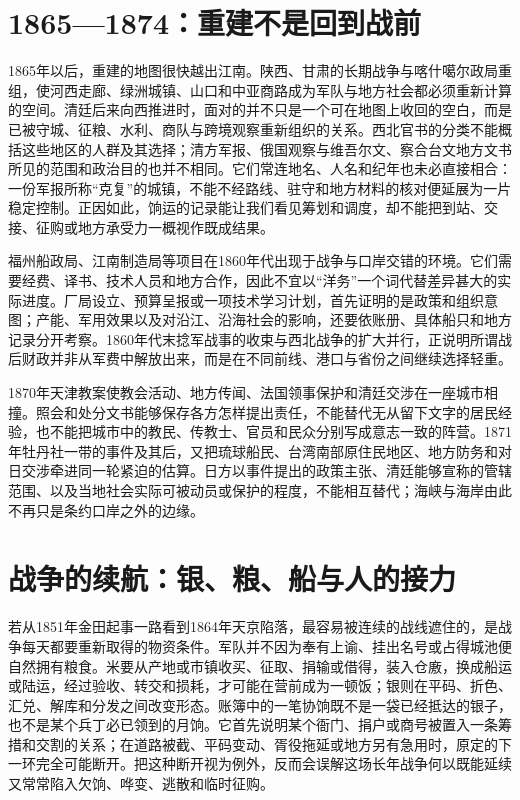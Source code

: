 \section{1865—1874：重建不是回到战前}

1865年以后，重建的地图很快越出江南。陕西、甘肃的长期战争与喀什噶尔政局重组，使河西走廊、绿洲城镇、山口和中亚商路成为军队与地方社会都必须重新计算的空间。清廷后来向西推进时，面对的并不只是一个可在地图上收回的空白，而是已被守城、征粮、水利、商队与跨境观察重新组织的关系。西北官书的分类不能概括这些地区的人群及其选择；清方军报、俄国观察与维吾尔文、察合台文地方文书所见的范围和政治目的也并不相同。它们常连地名、人名和纪年也未必直接相合：一份军报所称“克复”的城镇，不能不经路线、驻守和地方材料的核对便延展为一片稳定控制。正因如此，饷运的记录能让我们看见筹划和调度，却不能把到站、交接、征购或地方承受力一概视作既成结果。

福州船政局、江南制造局等项目在1860年代出现于战争与口岸交错的环境。它们需要经费、译书、技术人员和地方合作，因此不宜以“洋务”一个词代替差异甚大的实际进度。厂局设立、预算呈报或一项技术学习计划，首先证明的是政策和组织意图；产能、军用效果以及对沿江、沿海社会的影响，还要依账册、具体船只和地方记录分开考察。1860年代末捻军战事的收束与西北战争的扩大并行，正说明所谓战后财政并非从军费中解放出来，而是在不同前线、港口与省份之间继续选择轻重。

1870年天津教案使教会活动、地方传闻、法国领事保护和清廷交涉在一座城市相撞。照会和处分文书能够保存各方怎样提出责任，不能替代无从留下文字的居民经验，也不能把城市中的教民、传教士、官员和民众分别写成意志一致的阵营。1871年牡丹社一带的事件及其后，又把琉球船民、台湾南部原住民地区、地方防务和对日交涉牵进同一轮紧迫的估算。日方以事件提出的政策主张、清廷能够宣称的管辖范围、以及当地社会实际可被动员或保护的程度，不能相互替代；海峡与海岸由此不再只是条约口岸之外的边缘。

\section{战争的续航：银、粮、船与人的接力}

若从1851年金田起事一路看到1864年天京陷落，最容易被连续的战线遮住的，是战争每天都要重新取得的物资条件。军队并不因为奉有上谕、挂出名号或占得城池便自然拥有粮食。米要从产地或市镇收买、征取、捐输或借得，装入仓廒，换成船运或陆运，经过验收、转交和损耗，才可能在营前成为一顿饭；银则在平码、折色、汇兑、解库和分发之间改变形态。账簿中的一笔协饷既不是一袋已经抵达的银子，也不是某个兵丁必已领到的月饷。它首先说明某个衙门、捐户或商号被置入一条筹措和交割的关系；在道路被截、平码变动、胥役拖延或地方另有急用时，原定的下一环完全可能断开。把这种断开视为例外，反而会误解这场长年战争何以既能延续又常常陷入欠饷、哗变、逃散和临时征购。

